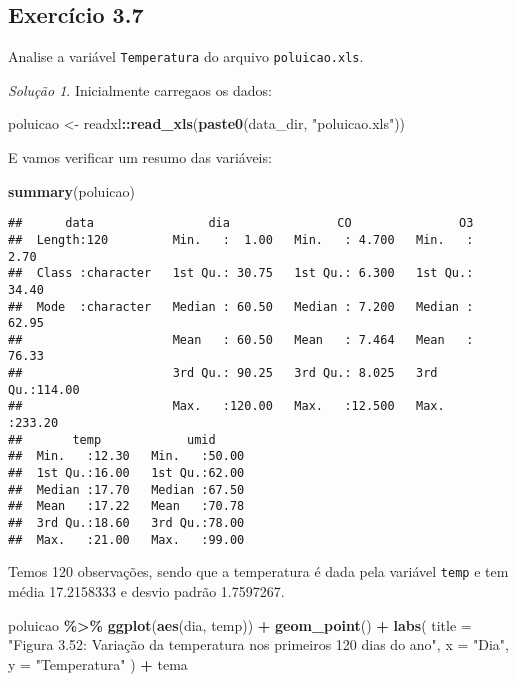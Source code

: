 \documentclass[
]{latex/krantz}
\newenvironment{Shaded}{\begin{snugshade}}{\end{snugshade}}
\newcommand{\AttributeTok}[1]{\textcolor[rgb]{0.13,0.29,0.53}{#1}}
\newcommand{\FunctionTok}[1]{\textcolor[rgb]{0.13,0.29,0.53}{\textbf{#1}}}
\newcommand{\NormalTok}[1]{#1}
\newcommand{\OtherTok}[1]{\textcolor[rgb]{0.56,0.35,0.01}{#1}}
\newcommand{\SpecialCharTok}[1]{\textcolor[rgb]{0.81,0.36,0.00}{\textbf{#1}}}
\newcommand{\StringTok}[1]{\textcolor[rgb]{0.31,0.60,0.02}{#1}}
\theoremstyle{definition}
\theoremstyle{definition}
\theoremstyle{definition}
\theoremstyle{definition}
\theoremstyle{remark}
\newtheorem*{solution}{Solução}
\begin{document}
\hypertarget{exr3-7}{%
\subsection*{Exercício 3.7}\label{exr3-7}}

Analise a variável \texttt{Temperatura} do arquivo \texttt{poluicao.xls}.

\begin{solution}
Inicialmente carregaos os dados:

\begin{Shaded}
\begin{Highlighting}[]
\NormalTok{poluicao }\OtherTok{\textless{}{-}}\NormalTok{ readxl}\SpecialCharTok{::}\FunctionTok{read\_xls}\NormalTok{(}\FunctionTok{paste0}\NormalTok{(data\_dir, }\StringTok{"poluicao.xls"}\NormalTok{))}
\end{Highlighting}
\end{Shaded}

E vamos verificar um resumo das variáveis:

\begin{Shaded}
\begin{Highlighting}[]
\FunctionTok{summary}\NormalTok{(poluicao)}
\end{Highlighting}
\end{Shaded}

\begin{verbatim}
##      data                dia               CO               O3        
##  Length:120         Min.   :  1.00   Min.   : 4.700   Min.   :  2.70  
##  Class :character   1st Qu.: 30.75   1st Qu.: 6.300   1st Qu.: 34.40  
##  Mode  :character   Median : 60.50   Median : 7.200   Median : 62.95  
##                     Mean   : 60.50   Mean   : 7.464   Mean   : 76.33  
##                     3rd Qu.: 90.25   3rd Qu.: 8.025   3rd Qu.:114.00  
##                     Max.   :120.00   Max.   :12.500   Max.   :233.20  
##       temp            umid      
##  Min.   :12.30   Min.   :50.00  
##  1st Qu.:16.00   1st Qu.:62.00  
##  Median :17.70   Median :67.50  
##  Mean   :17.22   Mean   :70.78  
##  3rd Qu.:18.60   3rd Qu.:78.00  
##  Max.   :21.00   Max.   :99.00
\end{verbatim}

Temos 120 observações, sendo que a temperatura é dada pela variável \texttt{temp} e tem média 17.2158333 e desvio padrão 1.7597267.

\begin{Shaded}
\begin{Highlighting}[]
\NormalTok{poluicao }\SpecialCharTok{\%\textgreater{}\%}
  \FunctionTok{ggplot}\NormalTok{(}\FunctionTok{aes}\NormalTok{(dia, temp)) }\SpecialCharTok{+}
    \FunctionTok{geom\_point}\NormalTok{() }\SpecialCharTok{+}
    \FunctionTok{labs}\NormalTok{(}
      \AttributeTok{title =} \StringTok{"Figura 3.52: Variação da temperatura nos primeiros 120 dias do ano"}\NormalTok{,}
      \AttributeTok{x =} \StringTok{"Dia"}\NormalTok{,}
      \AttributeTok{y =} \StringTok{"Temperatura"}
\NormalTok{    ) }\SpecialCharTok{+}
\NormalTok{    tema}
\end{Highlighting}
\end{Shaded}


\end{solution}
\end{document}
